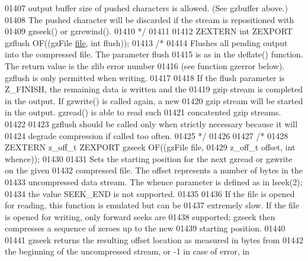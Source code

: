 \begin{DoxyCode}
01407 \textcolor{comment}{   output buffer size of pushed characters is allowed.  (See gzbuffer above.)}
01408 \textcolor{comment}{   The pushed character will be discarded if the stream is repositioned with}
01409 \textcolor{comment}{   gzseek() or gzrewind().}
01410 \textcolor{comment}{*/}
01411 
01412 ZEXTERN \textcolor{keywordtype}{int} ZEXPORT gzflush OF((gzFile \hyperlink{structfile}{file}, \textcolor{keywordtype}{int} flush));
01413 \textcolor{comment}{/*}
01414 \textcolor{comment}{     Flushes all pending output into the compressed file.  The parameter flush}
01415 \textcolor{comment}{   is as in the deflate() function.  The return value is the zlib error number}
01416 \textcolor{comment}{   (see function gzerror below).  gzflush is only permitted when writing.}
01417 \textcolor{comment}{}
01418 \textcolor{comment}{     If the flush parameter is Z\_FINISH, the remaining data is written and the}
01419 \textcolor{comment}{   gzip stream is completed in the output.  If gzwrite() is called again, a new}
01420 \textcolor{comment}{   gzip stream will be started in the output.  gzread() is able to read such}
01421 \textcolor{comment}{   concatented gzip streams.}
01422 \textcolor{comment}{}
01423 \textcolor{comment}{     gzflush should be called only when strictly necessary because it will}
01424 \textcolor{comment}{   degrade compression if called too often.}
01425 \textcolor{comment}{*/}
01426 
01427 \textcolor{comment}{/*}
01428 \textcolor{comment}{ZEXTERN z\_off\_t ZEXPORT gzseek OF((gzFile file,}
01429 \textcolor{comment}{                                   z\_off\_t offset, int whence));}
01430 \textcolor{comment}{}
01431 \textcolor{comment}{     Sets the starting position for the next gzread or gzwrite on the given}
01432 \textcolor{comment}{   compressed file.  The offset represents a number of bytes in the}
01433 \textcolor{comment}{   uncompressed data stream.  The whence parameter is defined as in lseek(2);}
01434 \textcolor{comment}{   the value SEEK\_END is not supported.}
01435 \textcolor{comment}{}
01436 \textcolor{comment}{     If the file is opened for reading, this function is emulated but can be}
01437 \textcolor{comment}{   extremely slow.  If the file is opened for writing, only forward seeks are}
01438 \textcolor{comment}{   supported; gzseek then compresses a sequence of zeroes up to the new}
01439 \textcolor{comment}{   starting position.}
01440 \textcolor{comment}{}
01441 \textcolor{comment}{     gzseek returns the resulting offset location as measured in bytes from}
01442 \textcolor{comment}{   the beginning of the uncompressed stream, or -1 in case of error, in}

\end{DoxyCode}
